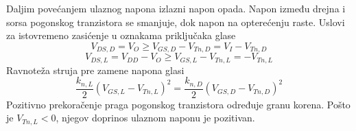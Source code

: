 Daljim povećanjem ulaznog napona izlazni napon opada. Napon između drejna i sorsa pogonskog tranzistora se smanjuje, dok napon na opterećenju raste. Uslovi za istovremeno zasićenje u oznakama priključaka glase
\[V_{DS,D}=V_O\ge V_{GS,D}-V_{Tn,D}=V_I-V_{Tn,D}\]
\[V_{DS,L}=V_{DD}-V_O\ge V_{GS,L}-V_{Tn,L}=-V_{Tn,L}\]
Ravnoteža struja pre zamene napona glasi
\[\frac{k_{n,L}}2(V_{GS,L}-V_{Tn,L})^2=\frac{k_{n,D}}2(V_{GS,D}-V_{Tn,D})^2\]
Pozitivno prekoračenje praga pogonskog tranzistora određuje granu korena. Pošto je $V_{Tn,L}<0$, njegov doprinos ulaznom naponu je pozitivan.
